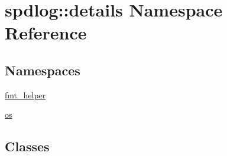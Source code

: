 \hypertarget{namespacespdlog_1_1details}{}\section{spdlog\+:\+:details Namespace Reference}
\label{namespacespdlog_1_1details}
\subsection*{Namespaces}
\begin{DoxyCompactItemize}
\item 
 \hyperlink{namespacespdlog_1_1details_1_1fmt__helper}{fmt\+\_\+helper}
\item 
 \hyperlink{namespacespdlog_1_1details_1_1os}{os}
\end{DoxyCompactItemize}
\subsection*{Classes}
